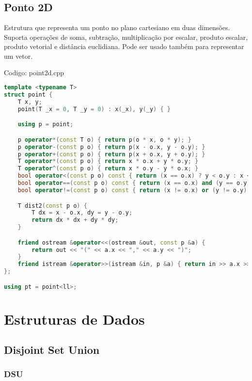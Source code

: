 \documentclass[10pt, a4paper, oneside]{book}
\begin{document}
\section{Ponto 2D}


Estrutura que representa um ponto no plano cartesiano em duas dimensões. Suporta operações de soma, subtração, multiplicação por escalar, produto escalar, produto vetorial e distância euclidiana. Pode ser usado também para representar um vetor.

\hfill

Codigo: point2d.cpp

\begin{lstlisting}[language=C++]
template <typename T>
struct point {
    T x, y;
    point(T _x = 0, T _y = 0) : x(_x), y(_y) { }

    using p = point;

    p operator*(const T o) { return p(o * x, o * y); }
    p operator-(const p o) { return p(x - o.x, y - o.y); }
    p operator+(const p o) { return p(x + o.x, y + o.y); }
    T operator*(const p o) { return x * o.x + y * o.y; }
    T operator^(const p o) { return x * o.y - y * o.x; }
    bool operator<(const p o) const { return (x == o.x) ? y < o.y : x < o.x; }
    bool operator==(const p o) const { return (x == o.x) and (y == o.y); }
    bool operator!=(const p o) const { return (x != o.x) or (y != o.y); }

    T dist2(const p o) {
        T dx = x - o.x, dy = y - o.y;
        return dx * dx + dy * dy;
    }

    friend ostream &operator<<(ostream &out, const p &a) {
        return out << "(" << a.x << "," << a.y << ")";
    }
    friend istream &operator>>(istream &in, p &a) { return in >> a.x >> a.y; }
};

using pt = point<ll>;\end{lstlisting}
\hfill

\newpage

%
%
%
%

\chapter{Estruturas de Dados}

\section{Disjoint Set Union}
\subsection{DSU}
\end{document}
